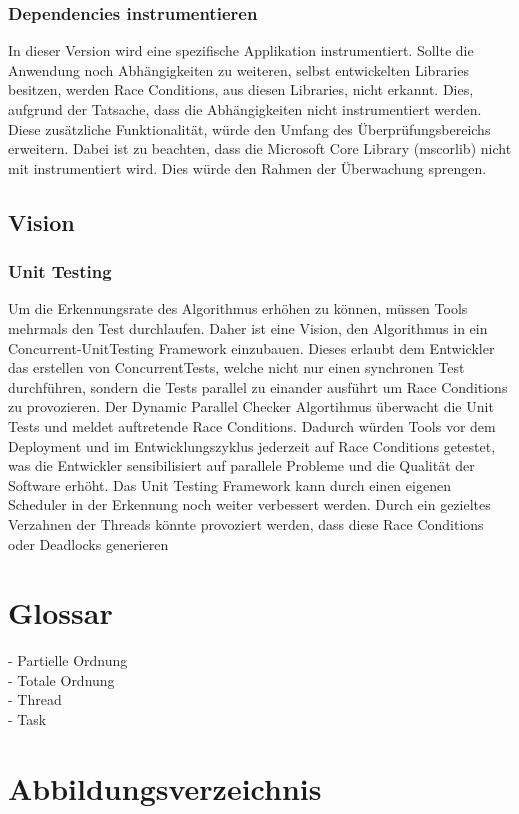 \documentclass[10pt,a4paper]{article}
\begin{document}
\subsubsection*{Dependencies instrumentieren}
In dieser Version wird eine spezifische Applikation instrumentiert. Sollte die Anwendung noch  Abhängigkeiten zu weiteren, selbst entwickelten Libraries besitzen, werden Race Conditions, aus diesen Libraries, nicht erkannt. Dies, aufgrund der Tatsache, dass die Abhängigkeiten nicht instrumentiert werden. Diese zusätzliche Funktionalität, würde den Umfang des Überprüfungsbereichs erweitern. Dabei ist zu beachten, dass die Microsoft Core Library (mscorlib) nicht mit instrumentiert wird. Dies würde den Rahmen der Überwachung sprengen.
\subsection{Vision}
\subsubsection*{Unit Testing}\label{vision_unittests}
Um die Erkennungsrate des Algorithmus erhöhen zu können, müssen Tools mehrmals den Test durchlaufen. Daher ist eine Vision, den Algorithmus in ein Concurrent-UnitTesting Framework einzubauen. Dieses erlaubt dem Entwickler das erstellen von ConcurrentTests, welche nicht nur einen synchronen Test durchführen, sondern die Tests parallel zu einander ausführt um Race Conditions zu provozieren. Der Dynamic Parallel Checker Algortihmus überwacht die Unit Tests und meldet auftretende Race Conditions. Dadurch würden Tools vor dem Deployment und im Entwicklungszyklus jederzeit auf Race Conditions getestet, was die Entwickler sensibilisiert auf parallele Probleme und die Qualität der Software erhöht. Das Unit Testing Framework kann durch einen eigenen Scheduler in der Erkennung noch weiter verbessert werden. Durch ein gezieltes Verzahnen der Threads könnte provoziert werden, dass diese Race Conditions oder Deadlocks generieren
\section*{Glossar}
- Partielle Ordnung\\
- Totale Ordnung\\
- Thread\\
- Task\\
\section*{Abbildungsverzeichnis}
\makeatletter
{}
\makeatother
\end{document}

